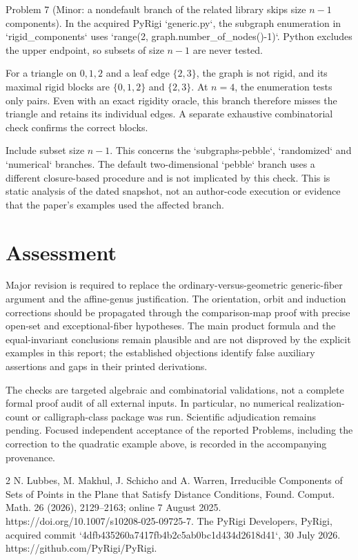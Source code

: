\documentclass[10pt]{article}
\begin{document}
Problem 7 (Minor: a nondefault branch of the related library skips size \(n-1\) components).  In the acquired PyRigi `generic.py`, the subgraph enumeration in `rigid\_components` uses `range(2, graph.number\_of\_nodes()-1)`. Python excludes the upper endpoint, so subsets of size \(n-1\) are never tested.\par
For a triangle on \(0,1,2\) and a leaf edge \(\{2,3\}\), the graph is not rigid, and its maximal rigid blocks are \(\{0,1,2\}\) and \(\{2,3\}\). At \(n=4\), the enumeration tests only pairs. Even with an exact rigidity oracle, this branch therefore misses the triangle and retains its individual edges. A separate exhaustive combinatorial check confirms the correct blocks.\par
Include subset size \(n-1\). This concerns the `subgraphs-pebble`, `randomized` and `numerical` branches. The default two-dimensional `pebble` branch uses a different closure-based procedure and is not implicated by this check. This is static analysis of the dated snapshot, not an author-code execution or evidence that the paper’s examples used the affected branch.\par
\section*{Assessment}
Major revision is required to replace the ordinary-versus-geometric generic-fiber argument and the affine-genus justification. The orientation, orbit and induction corrections should be propagated through the comparison-map proof with precise open-set and exceptional-fiber hypotheses. The main product formula and the equal-invariant conclusions remain plausible and are not disproved by the explicit examples in this report; the established objections identify false auxiliary assertions and gaps in their printed derivations.\par
The checks are targeted algebraic and combinatorial validations, not a complete formal proof audit of all external inputs. In particular, no numerical realization-count or calligraph-class package was run. Scientific adjudication remains pending. Focused independent acceptance of the reported Problems, including the correction to the quadratic example above, is recorded in the accompanying provenance.\par
2 N. Lubbes, M. Makhul, J. Schicho and A. Warren, Irreducible Components of Sets of Points in the Plane that Satisfy Distance Conditions, Found. Comput. Math. 26 (2026), 2129–2163; online 7 August 2025. https://doi.org/10.1007/s10208-025-09725-7. The PyRigi Developers, PyRigi, acquired commit `4dfb435260a7417fb4b2c5ab0bc1d434d2618d41`, 30 July 2026. https://github.com/PyRigi/PyRigi.\par
\end{document}
